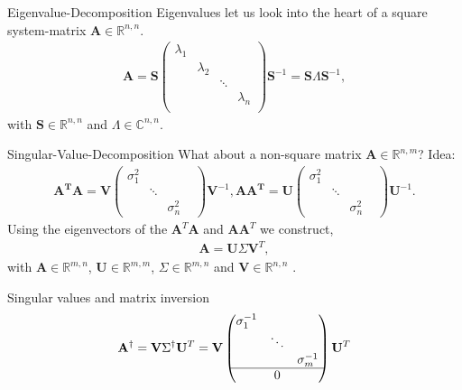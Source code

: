 \documentclass[notes]{beamer}
\begin{document}
  \begin{frame}{Eigenvalue-Decomposition \cite{strang2009introduction}}
  Eigenvalues let us look into the heart of a square system-matrix $\mathbf{A} \in \mathbb{R}^{n,n}$.
    \begin{align}
      \mathbf{A} 
      = \mathbf{S}\begin{pmatrix}
        \lambda_1 & & & \\
        & \lambda_2 & & \\
        & & \ddots    & \\
        & & & \lambda_n \\     
      \end{pmatrix}
      \mathbf{S}^{-1}
      =\mathbf{S}\Lambda \mathbf{S}^{-1},
    \end{align}
    with $\mathbf{S} \in \mathbb{R}^{n,n}$ and $\Lambda \in \mathbb{C}^{n,n}$. 
  \end{frame}

  \begin{frame}{Singular-Value-Decomposition \cite{strang2009introduction}}
    What about a non-square matrix $\mathbf{A} \in \mathbb{R}^{n,m}$? Idea:
    \begin{align}
      \mathbf{A^T}\mathbf{A} = \mathbf{V}
      \begin{pmatrix}
      \sigma_1^2 & & \\
      & \ddots & & \\
      & & \sigma_n^2   
      \end{pmatrix}
      \mathbf{V}^{-1},
      \mathbf{A}\mathbf{A^T} = \mathbf{U}
      \begin{pmatrix}
      \sigma_1^2 & & \\
      & \ddots & & \\
      & & \sigma_n^2   
      \end{pmatrix}
      \mathbf{U}^{-1}.
    \end{align}
    Using the eigenvectors of the $\mathbf{A}^T\mathbf{A}$ and $\mathbf{A}\mathbf{A}^T$ we construct, 
    \begin{align}
      \mathbf{A} = \mathbf{U}\Sigma \mathbf{V}^T,
    \end{align}
    with $\mathbf{A} \in \mathbb{R}^{m,n}$, $\mathbf{U} \in \mathbb{R}^{m,m}$, $\Sigma \in \mathbb{R}^{m,n}$ and $\mathbf{V} \in \mathbb{R}^{n,n}$ .
  \end{frame}

  \begin{frame}{Singular values and matrix inversion \cite{golub1965calculating}}
    \begin{align}
      \mathbf{A}^{\dagger} = \mathbf{V} \Sigma^\dagger \mathbf{U}^T = \mathbf{V} \begin{pmatrix}
      \sigma_1^{-1} & & \\
      & \ddots &  \\
      & & \sigma_m^{-1} \\ \hline 
      & 0 & \\
      \end{pmatrix} \mathbf{U}^T
    \end{align}
  \end{frame}
\end{document}
